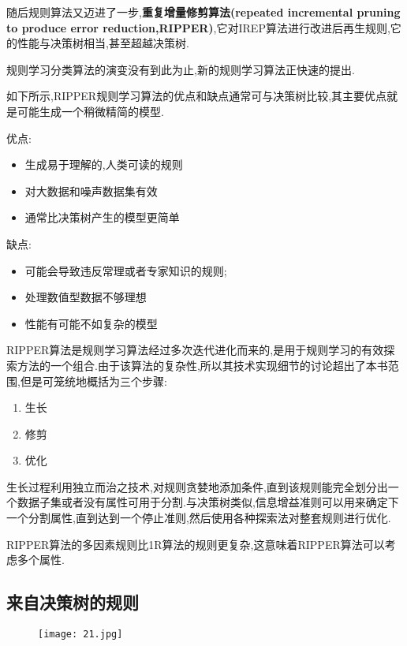 \documentclass[11pt,a4paper,oneside]{book}
\begin{document}
随后规则算法又迈进了一步,\textbf{重复增量修剪算法(repeated incremental pruning to produce error reduction,RIPPER)},它对IREP算法进行改进后再生规则,它的性能与决策树相当,甚至超越决策树.

\begin{tcolorbox}[colback=pink!10!white,colframe=pink!100!black]
规则学习分类算法的演变没有到此为止,新的规则学习算法正快速的提出.
\end{tcolorbox}

如下所示,RIPPER规则学习算法的优点和缺点通常可与决策树比较,其主要优点就是可能生成一个稍微精简的模型.
\begin{tcolorbox}[colback=pink!10!white,colframe=pink!100!black]
优点:
\begin{itemize}
	\item 生成易于理解的,人类可读的规则
	\item 对大数据和噪声数据集有效
	\item 通常比决策树产生的模型更简单
\end{itemize}
缺点:
\begin{itemize}
	\item 可能会导致违反常理或者专家知识的规则;
	\item 处理数值型数据不够理想
	\item 性能有可能不如复杂的模型
\end{itemize}
\end{tcolorbox}

RIPPER算法是规则学习算法经过多次迭代进化而来的,是用于规则学习的有效探索方法的一个组合.由于该算法的复杂性,所以其技术实现细节的讨论超出了本书范围,但是可笼统地概括为三个步骤:
\begin{enumerate}
	\item 生长
	\item 修剪
	\item 优化
\end{enumerate}

生长过程利用独立而治之技术,对规则贪婪地添加条件,直到该规则能完全划分出一个数据子集或者没有属性可用于分割.与决策树类似,信息增益准则可以用来确定下一个分割属性,直到达到一个停止准则,然后使用各种探索法对整套规则进行优化.

RIPPER算法的多因素规则比1R算法的规则更复杂,这意味着RIPPER算法可以考虑多个属性.

\subsection{来自决策树的规则}
\begin{figure}[H]
	\centering
	\texttt{[image: 21.jpg]}
\end{figure}
\end{document}
